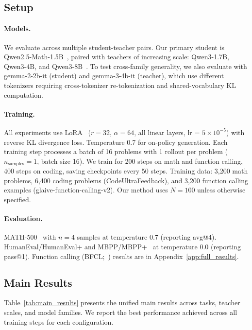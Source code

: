 \documentclass[10pt]{article}
\begin{document}
\subsection{Setup}

\paragraph{Models.} We evaluate across multiple student-teacher pairs. Our primary student is Qwen2.5-Math-1.5B~\citep{qwen2024qwen25math}, paired with teachers of increasing scale: Qwen3-1.7B, Qwen3-4B, and Qwen3-8B~\citep{qwen2025qwen3}. To test cross-family generality, we also evaluate with gemma-2-2b-it (student) and gemma-3-4b-it (teacher), which use different tokenizers requiring cross-tokenizer re-tokenization and shared-vocabulary KL computation.

\paragraph{Training.} All experiments use LoRA~\citep{hu2022lora} ($r{=}32$, $\alpha{=}64$, all linear layers, lr = $5{\times}10^{-5}$) with reverse KL divergence loss. Temperature 0.7 for on-policy generation. Each training step processes a batch of 16 problems with 1 rollout per problem ($n_{\text{samples}}{=}1$, batch size 16). We train for 200 steps on math and function calling, 400 steps on coding, saving checkpoints every 50 steps. Training data: 3,200 math problems, 6,400 coding problems (CodeUltraFeedback), and 3,200 function calling examples (glaive-function-calling-v2). Our method uses $N{=}100$ unless otherwise specified.

\paragraph{Evaluation.} MATH-500~\citep{hendrycks2021measuring, lightman2023verify} with $n{=}4$ samples at temperature 0.7 (reporting avg@4). HumanEval/HumanEval+ and MBPP/MBPP+~\citep{chen2021evaluating, austin2021program, liu2024evalplus} at temperature 0.0 (reporting pass@1). Function calling (BFCL;~\citealp{yan2024bfcl}) results are in Appendix~\ref{app:full_results}.

\subsection{Main Results}

Table~\ref{tab:main_results} presents the unified main results across tasks, teacher scales, and model families. We report the best performance achieved across all training steps for each configuration.
\end{document}

